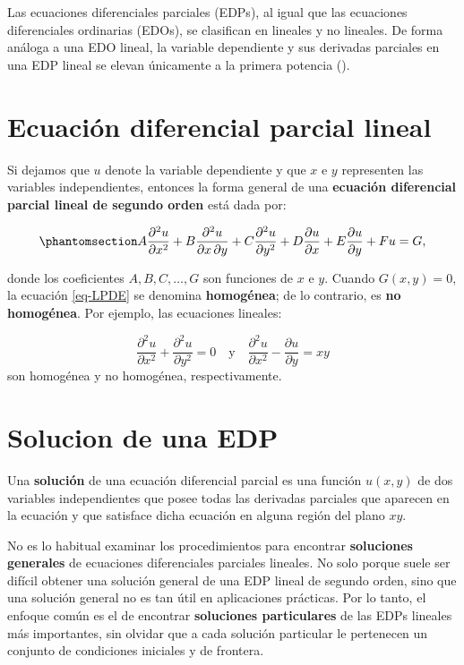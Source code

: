\documentclass[
  spanish,
  us-letterpaper,
  DIV=11,
  numbers=noendperiod]{scrreprt}
\theoremstyle{plain}
\theoremstyle{definition}
\theoremstyle{remark}
\begin{document}
Las ecuaciones diferenciales parciales (EDPs), al igual que las
ecuaciones diferenciales ordinarias (EDOs), se clasifican en lineales y
no lineales. De forma análoga a una EDO lineal, la variable dependiente
y sus derivadas parciales en una EDP lineal se elevan únicamente a la
primera potencia ().

\section{Ecuación diferencial parcial
lineal}\label{ecuaciuxf3n-diferencial-parcial-lineal}

Si dejamos que \(u\) denote la variable dependiente y que \(x\) e \(y\)
representen las variables independientes, entonces la forma general de
una \textbf{ecuación diferencial parcial lineal de segundo orden} está
dada por:

\begin{equation}\phantomsection\label{eq-LPDE}{
A \dfrac{\partial^2 u}{\partial x^2} + B \dfrac{\partial^2 u}{\partial x \, \partial y} + C \dfrac{\partial^2 u}{\partial y^2} + D \dfrac{\partial u}{\partial x} + E \dfrac{\partial u}{\partial y} + F u = G,
}\end{equation}

donde los coeficientes \(A, B, C, \dots, G\) son funciones de \(x\) e
\(y\). Cuando \(G(x, y) = 0\), la ecuación \ref{eq-LPDE} se denomina
\textbf{homogénea}; de lo contrario, es \textbf{no homogénea}. Por
ejemplo, las ecuaciones lineales:

\[
\dfrac{\partial^2 u}{\partial x^2} + \dfrac{\partial^2 u}{\partial y^2} = 0 \quad\text{y} \quad \dfrac{\partial^2 u}{\partial x^2} - \dfrac{\partial u}{\partial y} = x y
\] son homogénea y no homogénea, respectivamente.

\section{Solucion de una EDP}\label{solucion-de-una-edp}

Una \textbf{solución} de una ecuación diferencial parcial es una función
\(u(x, y)\) de dos variables independientes que posee todas las
derivadas parciales que aparecen en la ecuación y que satisface dicha
ecuación en alguna región del plano \(xy\).

No es lo habitual examinar los procedimientos para encontrar
\textbf{soluciones generales} de ecuaciones diferenciales parciales
lineales. No solo porque suele ser difícil obtener una solución general
de una EDP lineal de segundo orden, sino que una solución general no es
tan útil en aplicaciones prácticas. Por lo tanto, el enfoque común es el
de encontrar \textbf{soluciones particulares} de las EDPs lineales más
importantes, sin olvidar que a cada solución particular le pertenecen un
conjunto de condiciones iniciales y de frontera.
\end{document}
